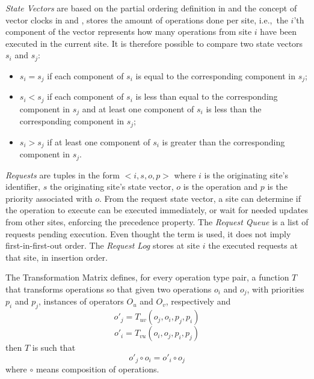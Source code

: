 \textit{State Vectors} are based on the partial ordering definition in \cite{Lamport1978} and the concept of vector clocks in \cite{Liskov1986} and \cite{Fidge1988}, stores the amount of operations done per site, i.e.,\ the $i$'th component of the vector represents how many operations from site $i$ have been executed in the current site. It is therefore possible to compare two state vectors $s_i$ and $s_j$:
\begin{itemize}
    \item $s_i = s_j$ if each component of $s_i$ is equal to the corresponding component in $s_j$;
    \item $s_i < s_j$ if each component of $s_i$ is less than equal to the corresponding component in $s_j$ and at least one component of $s_i$ is less than the corresponding component in $s_j$;
    \item $s_i > s_j$ if at least one component of $s_i$ is greater than the corresponding component in $s_j$.
\end{itemize}

\textit{Requests} are tuples in the form $<i,s,o,p>$ where $i$ is the originating site's identifier, $s$ the originating site's state vector, $o$ is the operation and $p$ is the priority associated with $o$.
From the request state vector, a site can determine if the operation to execute can be executed immediately, or wait for needed updates from other sites, enforcing the precedence property. The \textit{Request Queue} is a list of requests pending execution. Even thought the term  is used, it does not imply first-in-first-out order. The \textit{Request Log} stores at site $i$ the executed requests at that site, in insertion order.

The Transformation Matrix defines, for every operation type pair, a function $T$ that transforms operations so that given two operations $o_i$ and $o_j$, with priorities $p_i$ and $p_j$, instances of operators $O_u$ and $O_v$, respectively and
\begin{equation*}
    o'_j = T_{uv}(o_j, o_i, p_j, p_i)
\end{equation*}
\begin{equation*}
    o'_i = T_{vu}(o_i, o_j, p_i, p_j)
\end{equation*}
then $T$ is such that
\begin{equation*}
    o'_j \circ o_i = o'_i \circ o_j
\end{equation*}
where $\circ$ means composition of operations.

